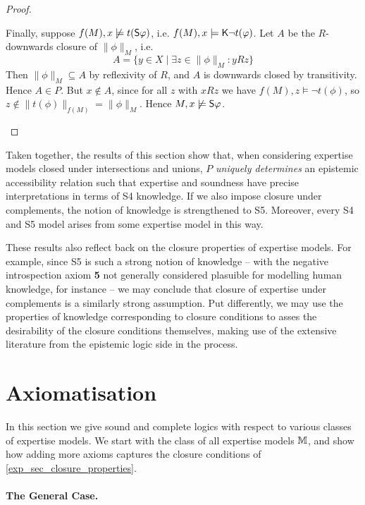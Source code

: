 \begin{proof}
\begin{itemize}
              Finally, suppose $f(M), x \not\models t(\S\phi)$, i.e.  $f(M), x
              \models \K\neg t(\phi)$. Let $A$ be the $R$-downwards closure of
              $\|\phi\|_M$, i.e.
              \[
                  A = \{y \in X \mid \exists z \in \|\phi\|_M: yRz\}
              \]
              Then $\|\phi\|_M \subseteq A$ by reflexivity of $R$, and $A$ is
              downwards closed by transitivity.  Hence $A \in P$.  But $x
              \notin A$, since for all $z$ with $xRz$ we have $f(M), z \models
              \neg t(\phi)$, so $z \notin \|t(\phi)\|_{f(M)} = \|\phi\|_M$.
              Hence $M, x \not\models \S\phi$.
    \end{itemize}
\end{proof}

Taken together, the results of this section show that, when considering
expertise models closed under intersections and unions, $P$ \emph{uniquely determines}
an epistemic accessibility relation such that expertise and soundness have
precise interpretations in terms of S4 knowledge. If we also impose closure
under complements, the notion of knowledge is strengthened to S5. Moreover,
every S4 and S5 model arises from some expertise model in this way.

These results also reflect back on the closure properties of expertise models.
For example, since S5 is such a strong notion of knowledge -- with the negative
introspection axiom \textbf{5} not generally considered plasuible for modelling
human knowledge, for instance -- we may conclude that closure of expertise
under complements is a similarly strong assumption. Put differently, we may use
the properties of knowledge corresponding to closure conditions to asses the
desirability of the closure conditions themselves, making use of the extensive
literature from the epistemic logic side in the process.

\section{Axiomatisation}
\label{exp_sec_axiomatisation}

In this section we give sound and complete logics with respect to various
classes of expertise models. We start with the class of all expertise
models $\M$, and show how adding more axioms captures the closure conditions of
\cref{exp_sec_closure_properties}.

\paragraph{The General Case.}

